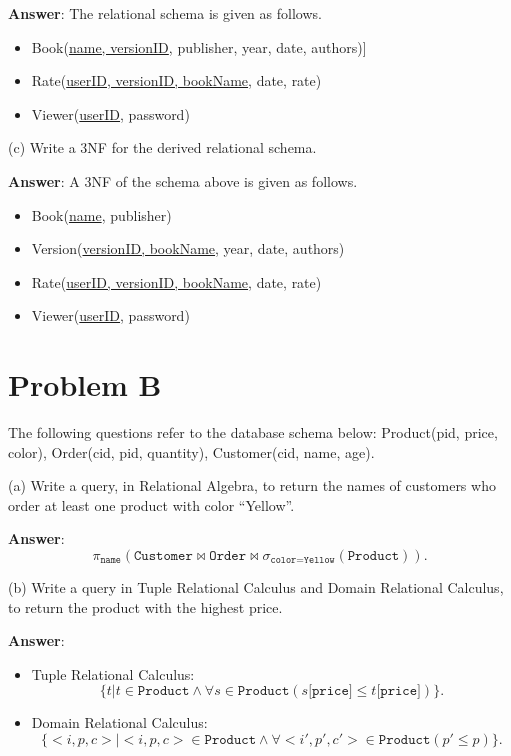 \documentclass{article}
\begin{document}
{\bf Answer}: The relational schema is given as follows.
\begin{itemize}
\item Book(\underline{name, versionID}, publisher, year, date, authors)]
\item Rate(\underline{userID, versionID, bookName}, date, rate)
\item Viewer(\underline{userID}, password)
\end{itemize}

(c) Write a 3NF for the derived relational schema.

{\bf Answer}: A 3NF of the schema above is given as follows.
\begin{itemize}
\item Book(\underline{name}, publisher)
\item Version(\underline{versionID, bookName}, year, date, authors)
\item Rate(\underline{userID, versionID, bookName}, date, rate)
\item Viewer(\underline{userID}, password)
\end{itemize}

\section{Problem B}
The following questions refer to the database schema below: Product(pid, price, color), Order(cid, pid, quantity), Customer(cid, name, age).

(a) Write a query, in Relational Algebra, to return the names of customers who order at least one product with color ``Yellow''.

{\bf Answer}: $$\pi_{\texttt{name}} (\texttt{Customer} \bowtie \texttt{Order} \bowtie \sigma_{\texttt{color} = \texttt{Yellow}}(\texttt{Product})).$$

(b) Write a query in Tuple Relational Calculus and Domain Relational Calculus, to return the product with the highest price.

{\bf Answer}: 
\begin{itemize}
\item Tuple Relational Calculus:
$$\{t | t \in \texttt{Product} \wedge \forall s \in \texttt{Product} (s\texttt{[price]} \leq t\texttt{[price]})\}.$$
\item Domain Relational Calculus:
$$\{<i, p, c> | <i, p, c> \in \texttt{Product} \wedge \forall <i', p', c'> \in \texttt{Product} (p' \leq p)\}.$$
\end{itemize}
\end{document}
